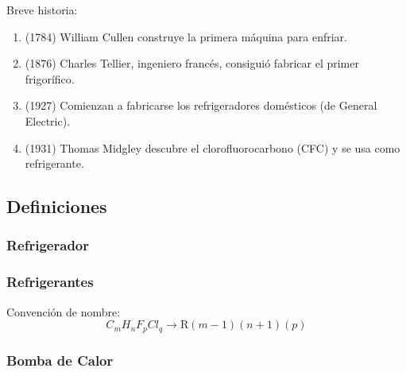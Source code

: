 Breve historia:
\begin{enumerate}
    \item (1784) William Cullen construye la primera máquina para enfriar.
    \item (1876) Charles Tellier, ingeniero francés, consiguió fabricar el primer frigorífico.
    \item (1927) Comienzan a fabricarse los refrigeradores domésticos (de General Electric).
    \item (1931) Thomas Midgley descubre el clorofluorocarbono (CFC) y se usa como refrigerante.
\end{enumerate}

    \subsection{Definiciones}
    
        \subsubsection{Refrigerador}
    
        \begin{quote}
        \end{quote}
        
        \subsubsection{Refrigerantes}
    
        \begin{quote}
        \end{quote}
        
        Convención de nombre:
        \[C_{m}H_{n}F_{p}{Cl}_{q} \rightarrow \text{R}(m-1)(n+1)(p)\]
        
        \begin{quote}
        \end{quote}
        
        \subsubsection{Bomba de Calor}
        
